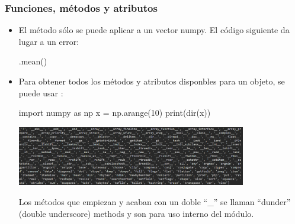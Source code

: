 \documentclass[handout,9pt]{beamer}
\begin{document}
\begin{frame}[fragile]
  \frametitle{Funciones, métodos y atributos}
  \begin{itemize}
  \item El método   sólo se puede aplicar a un vector numpy.
    El código siguiente da lugar a un error:
    \begin{pyverbatim}
[0, 1, 2, 3, 4, 5, 6, 7, 8, 9].mean()      
    \end{pyverbatim}
  \item<2-> Para obtener todos los métodos y atributos disponbles para
    un objeto, se puede usar :
    \begin{pyverbatim}
import numpy as np
x = np.arange(10)
print(dir(x))
\end{pyverbatim}
  \begin{center}
    \includegraphics[width=10cm]{../figures/dir_ndarray}
  \end{center}
  Los métodos que empiezan y acaban con un doble  ``\_'' se llaman
  ``dunder'' (double underscore)  methods y son para uso interno del módulo.
  \end{itemize}
\end{frame}
  
\end{document}
